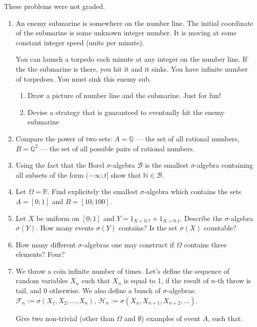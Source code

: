 \documentclass[pdftex,12pt,a4paper]{article}
\begin{document}
These problems were not graded.

\begin{enumerate}
\item  An enemy submarine is somewhere on the number line. The initial coordinate of the submarine is some unknown integer number. It is moving at some constant integer speed (units per minute).

You can launch a torpedo each minute at any integer on the number line. If the the submarine is there, you hit it and it sinks. You have infinite number of torpedoes. You must sink this enemy sub.
\begin{enumerate}
\item Draw a picture of number line and the submarine. Just for fun!
\item Devise a strategy that is guaranteed to eventually hit the enemy submarine
\end{enumerate}

\item Compare the power of two sets: $A=\mathbb{Q}$ --- the set of all rational numbers, $B=\mathbb{Q}^2$ --- the set of all possible pairs of rational numbers.

\item Using the fact that the Borel $\sigma$-algebra $\mathcal{B}$ is the smallest $\sigma$-algebra containing all subsets of the form $(-\infty; t]$ show that $\mathbb{N}\in \mathcal{B}$.

\item Let $\Omega=\mathbb{R}$. Find explicitely the smallest $\sigma$-algebra which contains the sets $A=[0;1]$ and $B=[10;100]$.

\item Let $X$ be uniform on $[0;1]$ and $Y=1_{X<0.7}+1_{X>0.1}$. Describe the $\sigma$-algebra $\sigma(Y)$. How many events  $\sigma(Y)$ contains? Is the set $\sigma(X)$ countable?

\item How many different $\sigma$-algebras one may construct if $\Omega$ contains three elements? Four?

\item We throw a coin infinite number of times. Let's define the sequence of random variables $X_n$ such that  $X_{n}$ is equal to 1, if the result of $n$-th throw is tail, and 0 otherwise. We also define a bunch of $ \sigma $-algebras: $\mathcal{F}_{n}:=\sigma(X_{1},X_{2},...,X_{n})$, $\mathcal{H}_{n}:=\sigma(X_{n},X_{n+1},X_{n+2},\ldots)$.

Give two non-trivial (other  than $ \Omega $ and $ \emptyset $) examples of event $ A $, such that:


\end{enumerate}
\end{document}
